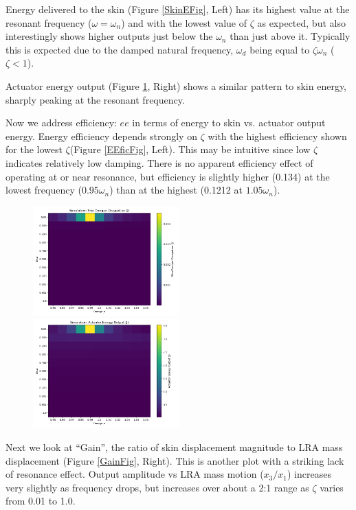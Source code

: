 \documentclass[letterpaper,11pt]{article}
\begin{document}
Energy delivered to the skin (Figure \ref{SkinEFig}, Left) has its highest value at the resonant
frequency ($\omega=\omega_n$) and with the lowest value of
$\zeta$ as expected, but also interestingly shows higher outputs
just below the $\omega_n$ than just above it.  Typically this is expected
due to the damped natural frequency, $\omega_d$ being equal to $\zeta\omega_n$ ($\zeta<1$).



\clearpage
Actuator energy output  (Figure \ref{EoutFig}, Right) shows a similar pattern to skin energy,
sharply peaking at the resonant frequency.


Now we address efficiency: $ee$ in terms of energy to skin vs. actuator output energy.
Energy efficiency depends strongly on $\zeta$ with the highest efficiency shown for
the lowest $\zeta$(Figure \ref{EEficFig}, Left).
This may be intuitive since low $\zeta$ indicates relatively low
damping.   There is no apparent efficiency effect of operating at  or near resonance,
but efficiency is slightly higher (0.134) at the lowest frequency ($0.95\omega_n$)
than at the highest (0.1212 at $1.05\omega_n$).


\begin{figure}
\includegraphics[width=0.5\textwidth]{heatmap_SkinE_11x11.png}
\includegraphics[width=0.5\textwidth]{heatmap_actOutput_11x11.png}
\caption{}\label{SkinEFig}\label{EoutFig}
\end{figure}

 Next we look at ``Gain'', the ratio of skin displacement magnitude to LRA mass displacement
(Figure \ref{GainFig}, Right).
This is another plot with a striking lack of resonance effect.  Output amplitude
vs LRA mass motion ($x_3/x_1$) increases very slightly as frequency drops, but
increases over about a 2:1 range as $\zeta$ varies from 0.01 to 1.0.
\end{document}
